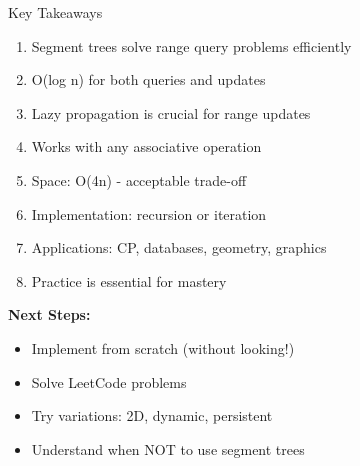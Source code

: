\documentclass[aspectratio=169]{beamer}
\begin{document}
\begin{frame}{Key Takeaways}
  \begin{enumerate}
    \item Segment trees solve range query problems efficiently
    \item O(log n) for both queries and updates
    \item Lazy propagation is crucial for range updates
    \item Works with any associative operation
    \item Space: O(4n) - acceptable trade-off
    \item Implementation: recursion or iteration
    \item Applications: CP, databases, geometry, graphics
    \item Practice is essential for mastery
  \end{enumerate}

  \vspace{0.5cm}
  \textbf{Next Steps:}
  \begin{itemize}
    \item Implement from scratch (without looking!)
    \item Solve LeetCode problems
    \item Try variations: 2D, dynamic, persistent
    \item Understand when NOT to use segment trees
  \end{itemize}
\end{frame}
\end{document}
